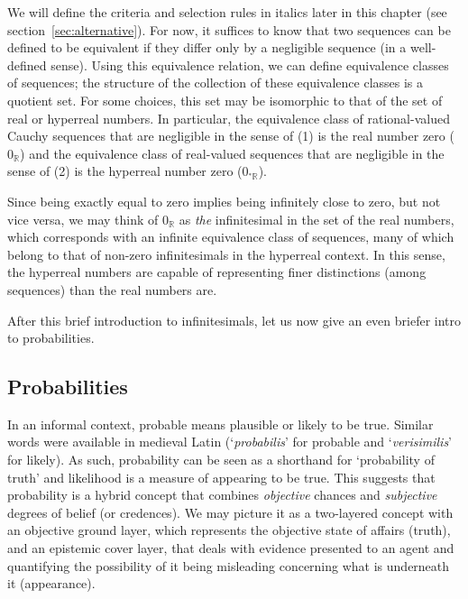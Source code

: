 We will define the criteria and selection rules in italics later in this chapter (see section~\ref{sec:alternative}). For now, it suffices to know that two sequences can be defined to be equivalent if they differ only by a negligible sequence (in a well-defined sense). Using this equivalence relation, we can define equivalence classes of sequences; the structure of the collection of these equivalence classes is a quotient set. For some choices, this set may be isomorphic to that of the set of real or hyperreal numbers. In particular, the equivalence class of rational-valued Cauchy sequences that are negligible in the sense of (1) is the real number zero ($0_\mathbb{R}$) and the equivalence class of real-valued sequences that are negligible in the sense of (2) is the hyperreal number zero ($0_{{^*} \mathbb{R}}$).

Since being exactly equal to zero implies being infinitely close to zero, but not vice versa, we may think of $0_\mathbb{R}$ as \emph{the} infinitesimal in the set of the real numbers, which corresponds with an infinite equivalence class of sequences, many of which belong to that of non-zero infinitesimals in the hyperreal context.
In this sense, the hyperreal numbers are capable of representing finer distinctions (among sequences) than the real numbers are.

After this brief introduction to infinitesimals, let us now give an even briefer intro to probabilities.

\subsection*{Probabilities}
In an informal context, probable means plausible or likely to be true. Similar words were available in medieval Latin (`\textit{probabilis}' for probable and `\textit{verisimilis}' for likely). As such, probability can be seen as a shorthand for `probability of truth' and likelihood is a measure of appearing to be true. This suggests that probability is a hybrid concept that combines \emph{objective} chances and \emph{subjective} degrees of belief (or credences). We may picture it as a two-layered concept with an objective ground layer, which represents the objective state of affairs (truth), and an epistemic cover layer, that deals with evidence presented to an agent and quantifying the possibility of it being misleading concerning what is underneath it (appearance).

